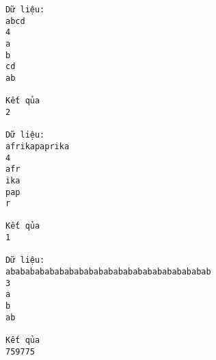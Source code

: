 \begin{verbatim}
Dữ liệu:
abcd
4
a
b
cd
ab

Kết qủa
2

Dữ liệu:
afrikapaprika
4
afr
ika
pap
r

Kết qủa
1

Dữ liệu:
ababababababababababababababababababababab
3
a
b
ab

Kết qủa
759775
\end{verbatim}